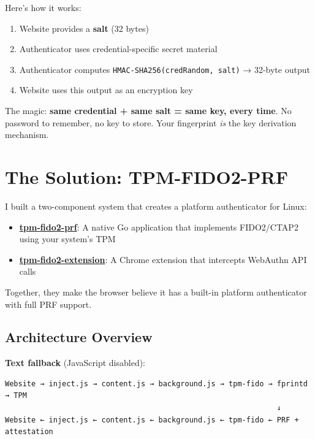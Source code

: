 \documentclass{article}
\begin{document}
Here's how it works:

\begin{enumerate}
\item Website provides a \textbf{salt} (32 bytes)

\item Authenticator uses credential-specific secret material

\item Authenticator computes \texttt{HMAC-SHA256(credRandom, salt)} → 32-byte output

\item Website uses this output as an encryption key

\end{enumerate}

The magic: \textbf{same credential + same salt = same key, every time}. No password to remember, no key to store. Your fingerprint \emph{is} the key derivation mechanism.

\section{The Solution: TPM-FIDO2-PRF}

I built a two-component system that creates a platform authenticator for Linux:

\begin{itemize}
\item \textbf{\href{https://github.com/vitorpy/tpm-fido2-prf}{tpm-fido2-prf}}: A native Go application that implements FIDO2/CTAP2 using your system's TPM

\item \textbf{\href{https://github.com/vitorpy/tpm-fido2-extension}{tpm-fido2-extension}}: A Chrome extension that intercepts WebAuthn API calls

\end{itemize}

Together, they make the browser believe it has a built-in platform authenticator with full PRF support.

\subsection{Architecture Overview}

\textbf{Text fallback} (JavaScript disabled):

\begin{verbatim}
Website → inject.js → content.js → background.js → tpm-fido → fprintd → TPM
                                                              ↓
Website ← inject.js ← content.js ← background.js ← tpm-fido ← PRF + attestation
\end{verbatim}
\end{document}
